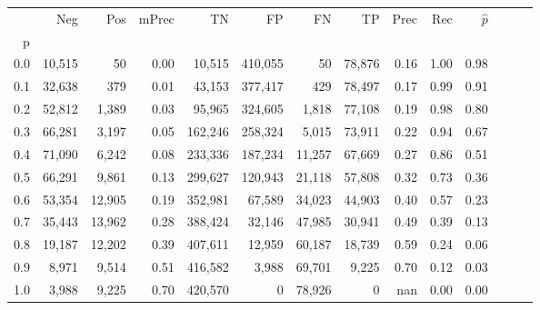 \begin{tabular}{rrrrrrrrrrrrrr}
\toprule
{} &     Neg &     Pos & mPrec &       TN &       FP &      FN &      TP &  Prec &   Rec & $\hat{p}$ \\
p   &         &         &       &          &          &         &         &       &       &           \\
\midrule
0.0 &  10,515 &      50 &  0.00 &   10,515 &  410,055 &      50 &  78,876 &  0.16 &  1.00 &      0.98 \\
0.1 &  32,638 &     379 &  0.01 &   43,153 &  377,417 &     429 &  78,497 &  0.17 &  0.99 &      0.91 \\
0.2 &  52,812 &   1,389 &  0.03 &   95,965 &  324,605 &   1,818 &  77,108 &  0.19 &  0.98 &      0.80 \\
0.3 &  66,281 &   3,197 &  0.05 &  162,246 &  258,324 &   5,015 &  73,911 &  0.22 &  0.94 &      0.67 \\
0.4 &  71,090 &   6,242 &  0.08 &  233,336 &  187,234 &  11,257 &  67,669 &  0.27 &  0.86 &      0.51 \\
0.5 &  66,291 &   9,861 &  0.13 &  299,627 &  120,943 &  21,118 &  57,808 &  0.32 &  0.73 &      0.36 \\
0.6 &  53,354 &  12,905 &  0.19 &  352,981 &   67,589 &  34,023 &  44,903 &  0.40 &  0.57 &      0.23 \\
0.7 &  35,443 &  13,962 &  0.28 &  388,424 &   32,146 &  47,985 &  30,941 &  0.49 &  0.39 &      0.13 \\
0.8 &  19,187 &  12,202 &  0.39 &  407,611 &   12,959 &  60,187 &  18,739 &  0.59 &  0.24 &      0.06 \\
0.9 &   8,971 &   9,514 &  0.51 &  416,582 &    3,988 &  69,701 &   9,225 &  0.70 &  0.12 &      0.03 \\
1.0 &   3,988 &   9,225 &  0.70 &  420,570 &        0 &  78,926 &       0 &   nan &  0.00 &      0.00 \\
\bottomrule
\end{tabular}

